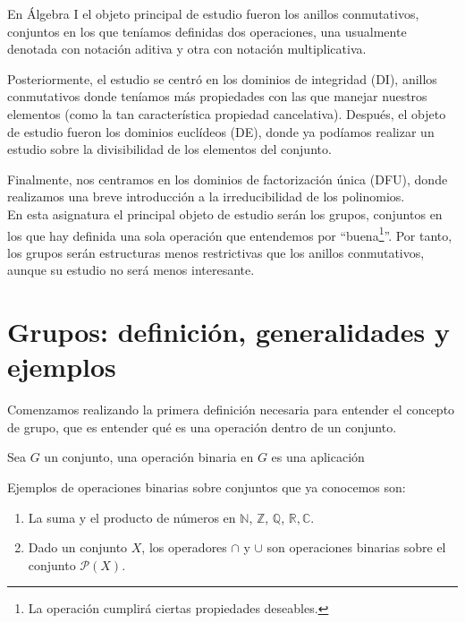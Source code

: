 En Álgebra I el objeto principal de estudio fueron los anillos conmutativos, conjuntos en los que teníamos definidas dos operaciones, una usualmente denotada con notación aditiva y otra con notación multiplicativa.

Posteriormente, el estudio se centró en los dominios de integridad (DI), anillos conmutativos donde teníamos más propiedades con las que manejar nuestros elementos (como la tan característica propiedad cancelativa). Después, el objeto de estudio fueron los dominios euclídeos (DE), donde ya podíamos realizar un estudio sobre la divisibilidad de los elementos del conjunto.

Finalmente, nos centramos en los dominios de factorización única (DFU), donde realizamos una breve introducción a la irreducibilidad de los polinomios.\\

En esta asignatura el principal objeto de estudio serán los grupos, conjuntos en los que hay definida una sola operación que entendemos por ``buena\footnote{La operación cumplirá ciertas propiedades deseables.}''. Por tanto, los grupos serán estructuras menos restrictivas que los anillos conmutativos, aunque su estudio no será menos interesante.

\chapter{Grupos: definición, generalidades y ejemplos}
Comenzamos realizando la primera definición necesaria para entender el concepto de grupo, que es entender qué es una operación dentro de un conjunto.

\begin{definicion}
    Sea $G$ un conjunto, una operación binaria en $G$ es una aplicación
\end{definicion}

\begin{ejemplo}
    Ejemplos de operaciones binarias sobre conjuntos que ya conocemos son:
    \begin{enumerate}
        \item La suma y el producto de números en $\mathbb{N}$, $\mathbb{Z}$, $\mathbb{Q}$, $\mathbb{R}, \mathbb{C}$.
        \item Dado un conjunto $X$, los operadores $\cap$ y $\cup$ son operaciones binarias sobre el conjunto $\mathcal{P}(X)$.
    \end{enumerate}
\end{ejemplo}

